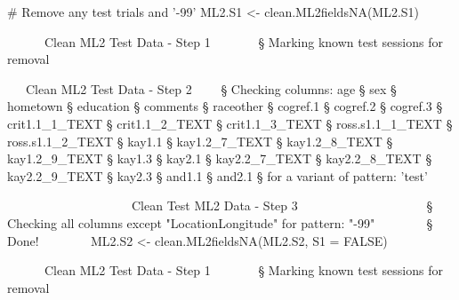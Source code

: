 \documentclass[]{article}
\newenvironment{Shaded}{\begin{snugshade}}{\end{snugshade}}
\newcommand{\KeywordTok}[1]{\textcolor[rgb]{0.94,0.87,0.69}{{#1}}}
\newcommand{\DataTypeTok}[1]{\textcolor[rgb]{0.87,0.87,0.75}{{#1}}}
\newcommand{\DecValTok}[1]{\textcolor[rgb]{0.86,0.86,0.80}{{#1}}}
\newcommand{\FloatTok}[1]{\textcolor[rgb]{0.75,0.75,0.82}{{#1}}}
\newcommand{\StringTok}[1]{\textcolor[rgb]{0.80,0.58,0.58}{{#1}}}
\newcommand{\CommentTok}[1]{\textcolor[rgb]{0.50,0.62,0.50}{{#1}}}
\newcommand{\OtherTok}[1]{\textcolor[rgb]{0.94,0.94,0.56}{{#1}}}
\newcommand{\ErrorTok}[1]{\textcolor[rgb]{0.76,0.75,0.62}{{#1}}}
\newcommand{\NormalTok}[1]{\textcolor[rgb]{0.80,0.80,0.80}{{#1}}}
\begin{document}
\begin{Shaded}
\begin{Highlighting}[]
\CommentTok{# Remove any test trials and '-99'}
\NormalTok{ML2.S1 <-}\StringTok{ }\KeywordTok{clean.ML2fieldsNA}\NormalTok{(ML2.S1)}

    
    \NormalTok{~}\ErrorTok{~~~~~}\NormalTok{Clean ML2 Test Data -}\StringTok{ }\NormalTok{Step }\DecValTok{1}\NormalTok{~}\ErrorTok{~~~~~~}
\StringTok{    }\NormalTok{§ Marking known test sessions for removal}
    
    \NormalTok{~}\ErrorTok{~~}\NormalTok{Clean ML2 Test Data -}\StringTok{ }\NormalTok{Step }\DecValTok{2}\NormalTok{~}\ErrorTok{~~~}
\StringTok{    }\NormalTok{§ Checking columns:}
\StringTok{         }\NormalTok{age}
    \NormalTok{§    sex}
    \NormalTok{§    hometown}
    \NormalTok{§    education}
    \NormalTok{§    comments}
    \NormalTok{§    raceother}
    \NormalTok{§    cogref}\FloatTok{.1}
    \NormalTok{§    cogref}\FloatTok{.2}
    \NormalTok{§    cogref}\FloatTok{.3}
    \NormalTok{§    crit1.1_1_TEXT}
    \NormalTok{§    crit1.1_2_TEXT}
    \NormalTok{§    crit1.1_3_TEXT}
    \NormalTok{§    ross.s1.1_1_TEXT}
    \NormalTok{§    ross.s1.1_2_TEXT}
    \NormalTok{§    kay1}\FloatTok{.1}
    \NormalTok{§    kay1.2_7_TEXT}
    \NormalTok{§    kay1.2_8_TEXT}
    \NormalTok{§    kay1.2_9_TEXT}
    \NormalTok{§    kay1}\FloatTok{.3}
    \NormalTok{§    kay2}\FloatTok{.1}
    \NormalTok{§    kay2.2_7_TEXT}
    \NormalTok{§    kay2.2_8_TEXT}
    \NormalTok{§    kay2.2_9_TEXT}
    \NormalTok{§    kay2}\FloatTok{.3}
    \NormalTok{§    and1}\FloatTok{.1}
    \NormalTok{§    and2}\FloatTok{.1}
    \NormalTok{§ for a variant of pattern:}\StringTok{ 'test'}
    
    \NormalTok{~}\ErrorTok{~~~~~~~~~~~~~~~~~~~}\NormalTok{Clean Test ML2 Data -}\StringTok{ }\NormalTok{Step }\DecValTok{3}\NormalTok{~}\ErrorTok{~~~~~~~~~~~~~~~~~~~}
\StringTok{    }\NormalTok{§ Checking all columns except }\StringTok{"LocationLongitude"} \NormalTok{for pattern:}\StringTok{ "-99"}
    \NormalTok{~}\ErrorTok{~~~~~~}
\StringTok{    }\NormalTok{§ Done!}
\StringTok{    }\ErrorTok{~~~~~~~}
\NormalTok{ML2.S2 <-}\StringTok{ }\KeywordTok{clean.ML2fieldsNA}\NormalTok{(ML2.S2, }\DataTypeTok{S1 =} \OtherTok{FALSE}\NormalTok{)}

    
    \NormalTok{~}\ErrorTok{~~~~~}\NormalTok{Clean ML2 Test Data -}\StringTok{ }\NormalTok{Step }\DecValTok{1}\NormalTok{~}\ErrorTok{~~~~~~}
\StringTok{    }\NormalTok{§ Marking known test sessions for removal}
    

\end{Highlighting}
\end{Shaded}
\end{document}
